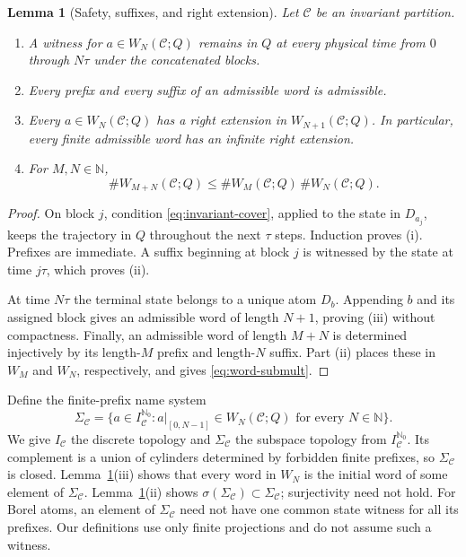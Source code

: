 \documentclass[11pt,reqno]{amsart}
\numberwithin{equation}{section}
\newtheorem{lemma}[theorem]{Lemma}
\theoremstyle{definition}
\newcommand{\N}{\mathbb N}
\newcommand{\Nzero}{\mathbb N_0}
\newcommand{\C}{\mathcal C}
\begin{document}
\begin{lemma}[Safety, suffixes, and right extension]\label{lem:safety}
Let $\C$ be an invariant partition.
\begin{enumerate}
\item A witness for $a\in W_N(\C;Q)$ remains in $Q$ at every physical time
from $0$ through $N\tau$ under the concatenated blocks.
\item Every prefix and every suffix of an admissible word is admissible.
\item Every $a\in W_N(\C;Q)$ has a right extension in
$W_{N+1}(\C;Q)$.  In particular, every finite admissible word has an
infinite right extension.
\item For $M,N\in\N$,
\begin{equation}\label{eq:word-submult}
 \#W_{M+N}(\C;Q)
 \le \#W_M(\C;Q)\,\#W_N(\C;Q).
\end{equation}
\end{enumerate}
\end{lemma}

\begin{proof}
On block $j$, condition \eqref{eq:invariant-cover}, applied to the state in
$D_{a_j}$, keeps the trajectory in $Q$ throughout the next $\tau$ steps.
Induction proves (i).  Prefixes are immediate.  A suffix beginning at block
$j$ is witnessed by the state at time $j\tau$, which proves (ii).

At time $N\tau$ the terminal state belongs to a unique atom $D_b$.
Appending $b$ and its assigned block gives an admissible word of length
$N+1$, proving (iii) without compactness.  Finally, an admissible word of
length $M+N$ is determined injectively by its length-$M$ prefix and
length-$N$ suffix.  Part (ii) places these in $W_M$ and $W_N$, respectively,
and gives \eqref{eq:word-submult}.
\end{proof}

Define the finite-prefix name system
\begin{equation}\label{eq:name-system}
 \Sigma_\C=\bigl\{a\in I_\C^{\Nzero}:a|_{[0,N-1]}\in W_N(\C;Q)
 \text{ for every }N\in\N\bigr\}.
\end{equation}
We give $I_\C$ the discrete topology and $\Sigma_\C$ the subspace topology
from $I_\C^{\Nzero}$.  Its complement is a union of cylinders determined by
forbidden finite prefixes, so $\Sigma_\C$ is closed.
Lemma~\ref{lem:safety}(iii) shows that every word in $W_N$ is the initial
word of some element of $\Sigma_\C$.  Lemma~\ref{lem:safety}(ii) shows
$\sigma(\Sigma_\C)\subset\Sigma_\C$; surjectivity need not hold.  For Borel
atoms, an element of $\Sigma_\C$ need not have one common state witness for
all its prefixes.  Our definitions use only finite projections and do not
assume such a witness.
\end{document}
